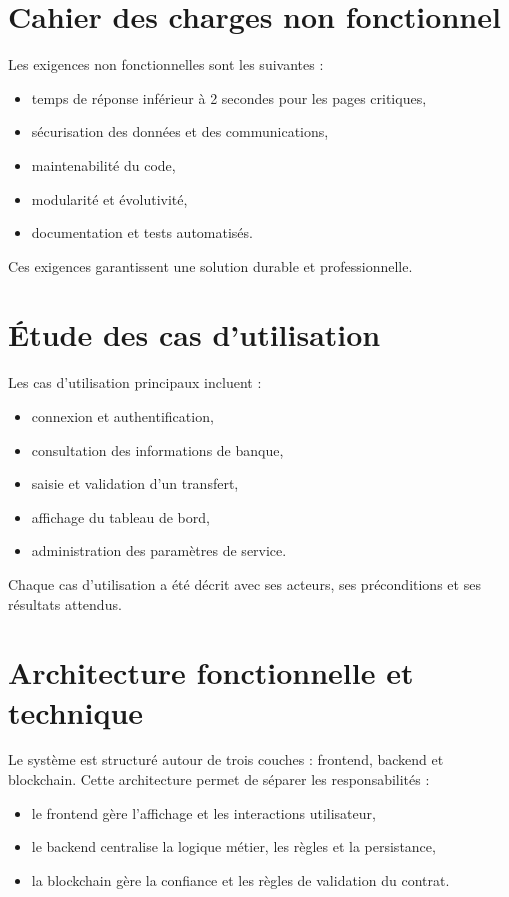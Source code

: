 \documentclass[a4paper,12pt]{report}
\begin{document}
\section{Cahier des charges non fonctionnel}
Les exigences non fonctionnelles sont les suivantes :
\begin{itemize}[leftmargin=*,nosep]
  \item temps de réponse inférieur à 2 secondes pour les pages critiques,
  \item sécurisation des données et des communications,
  \item maintenabilité du code,
  \item modularité et évolutivité,
  \item documentation et tests automatisés.
\end{itemize}
Ces exigences garantissent une solution durable et professionnelle.

\section{Étude des cas d'utilisation}
Les cas d'utilisation principaux incluent :
\begin{itemize}[leftmargin=*,nosep]
  \item connexion et authentification,
  \item consultation des informations de banque,
  \item saisie et validation d'un transfert,
  \item affichage du tableau de bord,
  \item administration des paramètres de service.
\end{itemize}
Chaque cas d'utilisation a été décrit avec ses acteurs, ses préconditions et ses résultats attendus.

\section{Architecture fonctionnelle et technique}
Le système est structuré autour de trois couches : frontend, backend et blockchain. Cette architecture permet de séparer les responsabilités :
\begin{itemize}[leftmargin=*,nosep]
  \item le frontend gère l'affichage et les interactions utilisateur,
  \item le backend centralise la logique métier, les règles et la persistance,
  \item la blockchain gère la confiance et les règles de validation du contrat.
\end{itemize}
\end{document}

